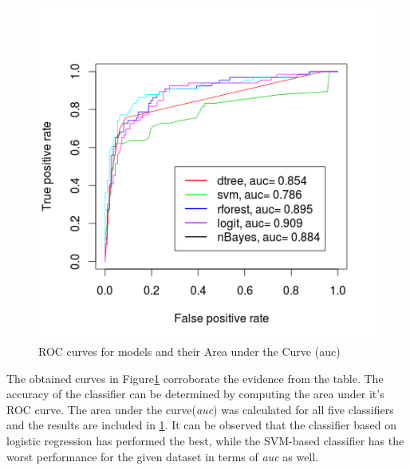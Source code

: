 \documentclass[a4paper,10pt]{report}\usepackage[]{graphicx}\usepackage[]{color}
\begin{document}
\begin{figure}[h]
  \begin{center}
  \includegraphics[scale=0.5]{rocr}
  \caption{ROC curves for models and their Area under the Curve (auc)} \label{rocr}
  \end{center}
\end{figure}

The obtained curves in Figure\ref{rocr} corroborate the evidence from the table. The accuracy of the classifier can be determined by computing the area under it's ROC curve. The area under the curve(\emph{auc}) was calculated for all five classifiers and the results are included in \ref{rocr}. It can be observed that the classifier based on logistic regression has performed the best, while the SVM-based classifier has the worst performance for the given dataset in terms of \emph{auc} as well.
\end{document}

